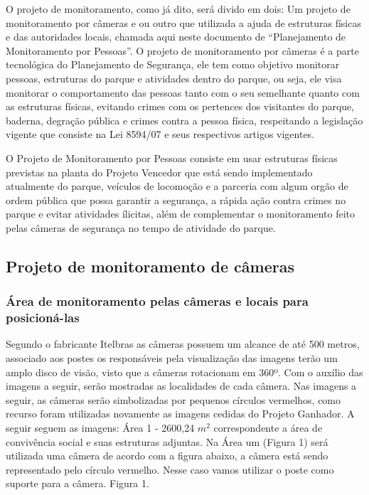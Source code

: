 	O projeto de monitoramento, como já dito, será divido em dois: Um projeto de monitoramento por câmeras e ou outro que utilizada a ajuda de estruturas  físicas e das autoridades locais,  chamada aqui neste documento de “Planejamento de Monitoramento por Pessoas”. O projeto de monitoramento  por câmeras é a parte tecnológica  do Planejamento de Segurança, ele tem como objetivo monitorar  pessoas, estruturas do parque e atividades dentro do parque, ou seja, ele visa monitorar o comportamento das pessoas tanto com o seu semelhante quanto com as estruturas físicas, evitando crimes com os pertences dos visitantes do parque, baderna, degração pública e crimes contra a pessoa física, respeitando a legislação vigente que consiste na Lei 8594/07 e seus respectivos artigos vigentes.
	
	O Projeto de Monitoramento por Pessoas consiste em usar estruturas físicas previstas na planta do Projeto Vencedor que está sendo implementado atualmente do parque, veículos de locomoção e a parceria com algum orgão de ordem pública que possa garantir a segurança, a rápida ação contra crimes no parque e evitar atividades ílicitas, além de complementar o monitoramento feito pelas câmeras de segurança no tempo de atividade do parque.

\subsection{Projeto de monitoramento de câmeras}

\subsubsection{Área de monitoramento pelas câmeras e locais para posicioná-las}

	Segundo o fabricante Itelbras as câmeras possuem um alcance de até 500 metros, associado aos postes os responsáveis pela visualização das imagens terão um amplo disco de visão, visto que a câmeras rotacionam em 360º. Com o auxílio das imagens a seguir, serão mostradas as localidades de cada câmera. Nas imagens a seguir, as câmeras serão simbolizadas por pequenos círculos vermelhos, como recurso foram utilizadas novamente as imagens cedidas do Projeto Ganhador. A seguir seguem as imagens:
	Área 1 - 2600,24 $m^{2}$ correspondente a área de convivência social e suas estruturas adjuntas. Na Área um (Figura 1) será utilizada uma câmera de acordo com a figura abaixo, a câmera está sendo representado pelo círculo vermelho. Nesse caso vamos utilizar o poste como suporte para a câmera. Figura 1.
	
